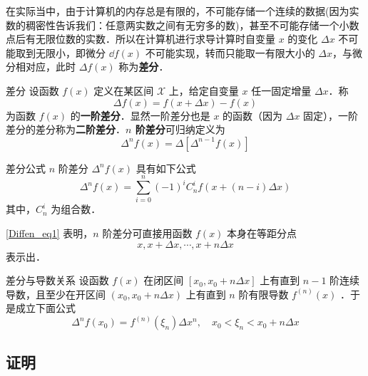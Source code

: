 在实际当中，由于计算机的内存总是有限的，不可能存储一个连续的数据(因为实数的稠密性告诉我们：任意两实数之间有无穷多的数)，甚至不可能存储一个小数点后有无限位数的实数．所以在计算机进行求导计算时自变量 $x$ 的变化 $\Delta x$ 不可能取到无限小，即微分 $\dd f({x})$ 不可能实现，转而只能取一有限大小的 $\Delta x$，与微分相对应，此时 $\Delta f(x)$ 称为\textbf{差分}．
\begin{definition}{差分}
设函数 $f(x)$ 定义在某区间 $\mathcal{X}$ 上，给定自变量 $x$ 任一固定增量 $\Delta x$．称
\begin{equation}
\Delta f(x)=f(x+\Delta x)-f(x)
\end{equation}
为函数 $f(x)$ 的\textbf{一阶差分}．显然一阶差分也是 $x$ 的函数（因为 $\Delta x$ 固定），一阶差分的差分称为\textbf{二阶差分}．\textbf{$n$ 阶差分}可归纳定义为
\begin{equation}
\Delta^n f(x)=\Delta[\Delta^{n-1}f(x)]
\end{equation}
\end{definition}
\begin{theorem}{差分公式}\label{Diffen_the1}
$n$ 阶差分 $\Delta^n f(x)$ 具有如下公式
\begin{equation}\label{Diffen_eq1}
\Delta^nf(x)=\sum_{i=0}^n(-1)^iC_n^if(x+(n-i)\Delta x)
\end{equation}
其中，$C_n^i$ 为组合数．
\end{theorem}
\autoref{Diffen_eq1} 表明，$n$ 阶差分可直接用函数 $f(x)$ 本身在等距分点
\begin{equation}
x,x+\Delta x,\cdots,x+n\Delta x
\end{equation}
表示出．
\begin{theorem}{差分与导数关系}
设函数 $f(x)$ 在闭区间 $[x_0,x_0+n\Delta x]$ 上有直到 $n-1$ 阶连续导数，且至少在开区间 $(x_0,x_0+n\Delta x)$ 上有直到 $n$ 阶有限导数 $f^{(n)}(x)$ ．于是成立下面公式
\begin{equation}
\Delta^nf(x_0)=f^{(n)}(\xi_n)\Delta x^n ,\quad x_0<\xi_n<x_0+n\Delta x
\end{equation}
\end{theorem}
\subsection{证明}
\subsubsection{}